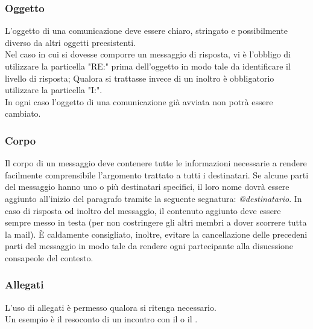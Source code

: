     \subsubsection{Oggetto}
      L'oggetto di una comunicazione deve essere chiaro, stringato e possibilmente diverso da altri oggetti preesistenti.\\
      Nel caso in cui si dovesse comporre un messaggio di risposta, vi è l'obbligo di utilizzare la particella "RE:" prima dell'oggetto in modo tale da identificare
      il livello di risposta; Qualora si trattasse invece di un inoltro è obbligatorio utilizzare la particella "I:".\\
      In ogni caso l'oggetto di una comunicazione già avviata non potrà essere cambiato.
    \subsubsection{Corpo}
      Il corpo di un messaggio deve contenere tutte le informazioni necessarie a rendere facilmente comprensibile l’argomento trattato a tutti i destinatari. Se alcune parti del messaggio hanno uno o più destinatari specifici, il loro nome dovrà essere aggiunto all’inizio del paragrafo tramite la seguente segnatura: \emph{@destinatario}.
      In caso di risposta od inoltro del messaggio, il contenuto aggiunto deve essere sempre messo in testa (per non costringere gli altri membri a dover scorrere tutta la mail).
      È caldamente consigliato, inoltre, evitare la cancellazione delle precedeni parti del messaggio in modo tale da rendere ogni partecipante alla disucssione consapeole del contesto.
    \subsubsection{Allegati}
      L'uso di allegati è permesso qualora si ritenga necessario.\\
      Un esempio è il resoconto di un incontro con il  o il .
